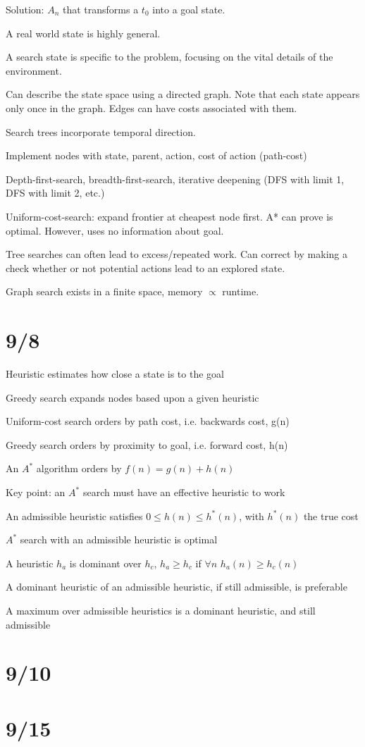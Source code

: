 \documentclass[12pt]{article}
\begin{document}
Solution: ${A_n}$ that transforms a $t_0$ into a goal state.

A real world state is highly general.

A search state is specific to the problem, focusing on the vital details of the environment.

Can describe the state space using a directed graph.  Note that each state appears only once in the graph.  Edges can have costs associated with them.

Search trees incorporate temporal direction.

Implement nodes with state, parent, action, cost of action (path-cost)

Depth-first-search, breadth-first-search, iterative deepening (DFS with limit 1, DFS with limit 2, etc.)

Uniform-cost-search: expand frontier at cheapest node first. A* can prove is optimal. However, uses no information about goal.

Tree searches can often lead to excess/repeated work.  Can correct by making a check whether or not potential actions lead to an explored state.

Graph search exists in a finite space, memory $\propto$ runtime.

\section{9/8}

Heuristic estimates how close a state is to the goal

Greedy search expands nodes based upon a given heuristic

Uniform-cost search orders by path cost, i.e. backwards cost, g(n)

Greedy search orders by proximity to goal, i.e. forward cost, h(n)

An $A^*$ algorithm orders by $f(n) = g(n) + h(n)$

Key point: an $A^*$ search must have an effective heuristic to work

An admissible heuristic satisfies $0 \leq h(n) \leq h^*(n)$, with $h^*(n)$ the true cost

$A^*$ search with an admissible heuristic is optimal

A heuristic $h_a$ is dominant over $h_c$, $h_a \geq h_c$ if $\forall n$ $h_a(n) \geq h_c(n)$

A dominant heuristic of an admissible heuristic, if still admissible, is preferable

A maximum over admissible heuristics is a dominant heuristic, and still admissible

\section{9/10}



\section{9/15}
\end{document}
